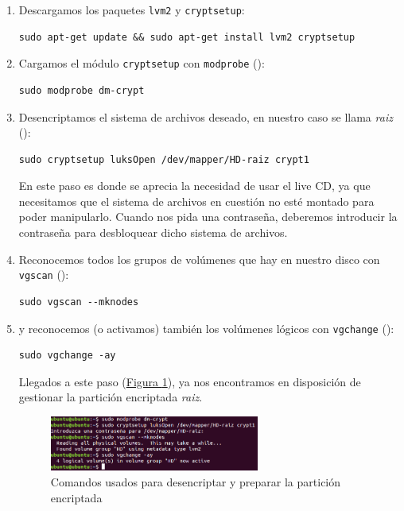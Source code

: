 \documentclass[10pt,a4paper,spanish]{article}
\numberwithin{equation}{section} %
\numberwithin{figure}{section} %
\numberwithin{table}{section} %
\begin{document}
\begin{enumerate}[1.]
    \item Descargamos los paquetes \texttt{lvm2} y \texttt{cryptsetup}:
\begin{verbatim}
sudo apt-get update && sudo apt-get install lvm2 cryptsetup    
\end{verbatim}
    \item Cargamos el módulo \texttt{cryptsetup} con \texttt{modprobe} (\cite{modprobe}):
\begin{verbatim}
sudo modprobe dm-crypt
\end{verbatim}
    \item Desencriptamos el sistema de archivos deseado, en nuestro caso se llama \textit{raiz} (\cite{cryptsetup}):
\begin{verbatim}
sudo cryptsetup luksOpen /dev/mapper/HD-raiz crypt1
\end{verbatim}

    En este paso es donde se aprecia la necesidad de usar el live CD, ya que necesitamos que el sistema de archivos en cuestión no esté montado para poder manipularlo. Cuando nos pida una contraseña, deberemos introducir la contraseña para desbloquear dicho sistema de archivos.

    \item Reconocemos todos los grupos de volúmenes que hay en nuestro disco con \texttt{vgscan} (\cite{vgscan}):
\begin{verbatim}
sudo vgscan --mknodes
\end{verbatim}
    \item y reconocemos (o activamos) también los volúmenes lógicos con \texttt{vgchange} (\cite{vgchange}):
\begin{verbatim}
sudo vgchange -ay
\end{verbatim}

Llegados a este paso (\hyperref[pasos]{Figura \ref*{pasos}}), ya nos encontramos en disposición de gestionar la partición encriptada \textit{raiz}.

\begin{figure}[!h]
    \centering
    \includegraphics[width=0.65\textwidth]{30}
    \caption{Comandos usados para desencriptar y preparar la partición encriptada}
    \label{pasos}
\end{figure}


\end{enumerate}
\end{document}
